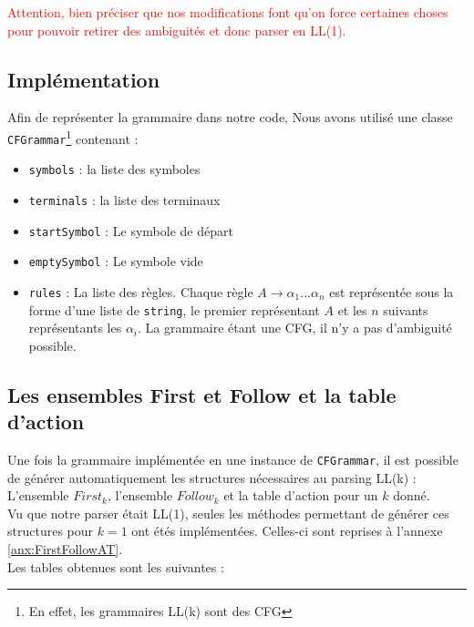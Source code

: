 \documentclass[a4paper,10pt]{article}
\begin{document}
\textcolor{red}{Attention, bien préciser que nos modifications font qu'on force certaines choses pour pouvoir retirer des ambiguités et donc parser en LL(1).}

\subsection{Implémentation}

Afin de représenter la grammaire dans notre code, Nous avons utilisé une classe \verb?CFGrammar?\footnote{En effet, les grammaires LL(k) sont des CFG} contenant :
\begin{itemize}

\item \verb?symbols? : la liste des symboles
\item \verb?terminals? : la liste des terminaux
\item \verb?startSymbol? : Le symbole de départ
\item \verb?emptySymbol? : Le symbole vide
\item \verb?rules? : La liste des règles. Chaque règle $A \rightarrow \alpha_1 ... \alpha_n$ est représentée sous la forme d'une liste de \verb?string?, le premier représentant $A$ et les $n$ suivants représentants les $\alpha_i$. La grammaire étant une CFG, il n'y a pas d'ambiguité possible.

\end{itemize}

\subsection{Les ensembles First et Follow et la table d'action}

Une fois la grammaire implémentée en une instance de \verb?CFGrammar?, il est possible de générer automatiquement les structures nécessaires au parsing LL(k) : L'ensemble $First_k$, l'ensemble $Follow_k$ et la table d'action pour un $k$ donné.\\

Vu que notre parser était LL(1), seules les méthodes permettant de générer ces structures pour $k = 1$ ont étés implémentées. Celles-ci sont reprises à l'annexe \ref{anx:FirstFollowAT}.\\

Les tables obtenues sont les suivantes : 
\end{document}

